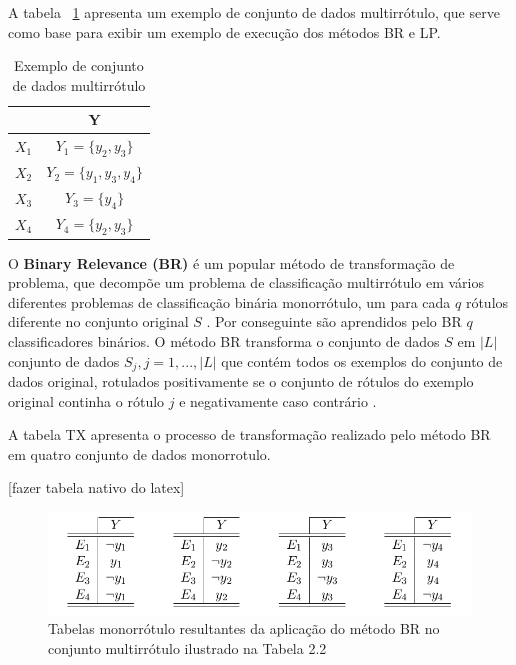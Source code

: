 A tabela ~\ref{tab:conjunto_multirrotulo_br_lp} apresenta um exemplo de conjunto de dados multirrótulo, que serve como base para exibir um exemplo de execução dos métodos BR e LP.


\begin{table}[h!]
    \centering
   \label{tab:conjunto_multirrotulo_br_lp}
    \begin{scriptsize}
       \begin{tabular}{c|c}

\hline
  	    &       Y	    			\\	\hline\hline
$X_1$	&	$Y_1 = \{y_2,y_3\}$	\\	\hline
$X_2$	&	$Y_2 = \{y_1,y_3,y_4\}$		\\	\hline
$X_3$	&	$Y_3 = \{y_4\}$		\\	\hline
$X_4$	&	$Y_4 = \{y_2,y_3\}$		\\	\hline

\end{tabular}
   \end{scriptsize}
\caption{Exemplo de conjunto de dados multirrótulo}
\end{table}

O \textbf{Binary Relevance (BR)} é um popular método de transformação de problema, que decompõe um problema de classificação multirrótulo em vários diferentes problemas de classificação binária monorrótulo, um para cada $q$ rótulos diferente no conjunto original $S$ \cite{cherman2011multi}. Por conseguinte são aprendidos pelo BR $q$ classificadores binários. O método BR transforma o conjunto de dados $S$ em $|L|$ conjunto de dados $S_j,j=1,...,|L|$ que contém todos os exemplos do conjunto de dados original, rotulados positivamente se o conjunto de rótulos do exemplo original continha o rótulo $j$ e negativamente caso contrário \cite{tsoumakas2011random}. 

A tabela TX apresenta o processo de transformação realizado pelo método BR em quatro conjunto de dados monorrotulo. 

[fazer tabela nativo do latex]

 \begin{figure}[!htb]
    \centering
    \includegraphics[scale=0.5]{figures/exemploBR}
    \caption{Tabelas monorrótulo resultantes da aplicação do método BR no conjunto multirrótulo ilustrado na Tabela 2.2}
  \end{figure}

